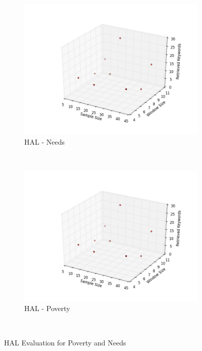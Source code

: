 \begin{figure}[H]
        \centering
        \begin{subfigure}[b]{0.5\textwidth}
                \includegraphics[width=\textwidth]{img/lex/needs_hal}
                \caption{HAL - Needs}
                \label{fig:al_price}
        \end{subfigure}%
        ~ %
       \begin{subfigure}[b]{0.5\textwidth}
                \includegraphics[width=\textwidth]{img/lex/needs_hal}
                \caption{HAL - Poverty}
                \label{fig:al_price}
        \end{subfigure}%
        ~ %
      
        \caption{HAL Evaluation for Poverty and Needs}\label{fig:poverty_needs}
\end{figure}

